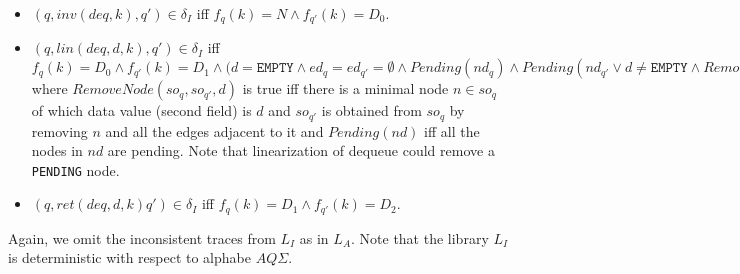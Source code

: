 \begin{itemize}
\begin{itemize}
\item $(q, inv(deq,k), q') \in \delta_I$ iff $f_q(k) = N \wedge f_{q'}(k) = D_0$.
\item $(q, lin(deq,d,k), q') \in \delta_I$ iff $f_q(k) = D_0 \wedge f_{q'}(k) = D_1 \wedge (d = \texttt{EMPTY} \wedge ed_q = ed_{q'} = \emptyset \wedge Pending(nd_q) \wedge Pending(nd_{q'} \vee d \neq \texttt{EMPTY} \wedge RemoveNode(so_q, so_{q'},d))$ where $RemoveNode(so_q, so_{q'},d)$ is true iff there is a minimal node $n \in so_q$ of which data value (second field) is $d$ and $so_{q'}$ is obtained from $so_q$ by removing $n$ and all the edges adjacent to it and $Pending(nd)$ iff all the nodes in $nd$ are pending. Note that linearization of dequeue could remove a \texttt{PENDING} node.  
\item $(q, ret(deq,d,k) q') \in \delta_I$ iff $f_q(k) = D_1 \wedge f_{q'}(k) = D_2$.
\end{itemize}
\end{itemize}
Again, we omit the inconsistent traces from $L_I$ as in $L_A$. Note that the library $L_I$ is deterministic with respect to alphabe $AQ\Sigma$.

